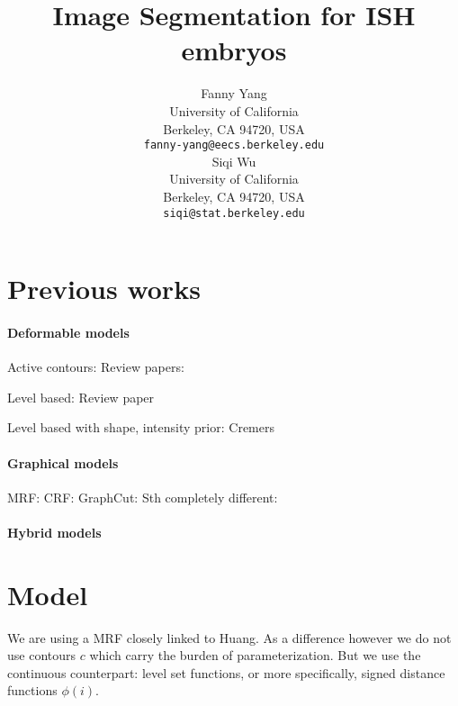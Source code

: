\documentclass{article} %
\begin{document}
\title{Image Segmentation for ISH embryos}

\author{
Fanny Yang\\
University of California\\
Berkeley, CA 94720, USA\\
\texttt{fanny-yang@eecs.berkeley.edu} \\
\And
Siqi Wu\\
University of California\\
Berkeley, CA 94720, USA\\
\texttt{siqi@stat.berkeley.edu}\\
}

\maketitle

\section{Previous works}

\paragraph{Deformable models}
Active contours:
\cite{Cootes92_ActiveShape,Cootes01_ActiveApp, Cootes92_TrainingShape, Kass88_Snakes}
\cite{Sclaroff01_RegionGroup, ElBaz09_ShapeApp, Leventon00_ShapeGeodesic}
Review papers: \cite{McInerney96_MIReview, Baswaraj12_ACReview}

Level based:
\cite{Tsai03_MILevelSets, ChanVese01}
Review paper \cite{Cremers07_Levelreview}

Level based with shape, intensity prior:
Cremers \cite{Cremers06_KernelDensity, Chan05_LevelShape, Chen09_LevelShapeIntensity}

\paragraph{Graphical models}
MRF: CRF: \cite{Lafferty01_CRFSeq, He04_MultiScale}
GraphCut: \cite{Lempitsky_BranchMin}
Sth completely different: \cite{Andres11_Probabilistic}

\paragraph{Hybrid models}
\cite{Huang04_MRFDM, Chen12_MIGraphCut, Uzunbas13_MultiOrgan, Schlesinger13}


\section{Model}
We are using a MRF closely linked to Huang. As a difference however we do not use contours $c$ which carry the burden of parameterization. But we use the continuous counterpart: level set functions, or more specifically, signed distance functions $\phi(i)$.
\end{document}
